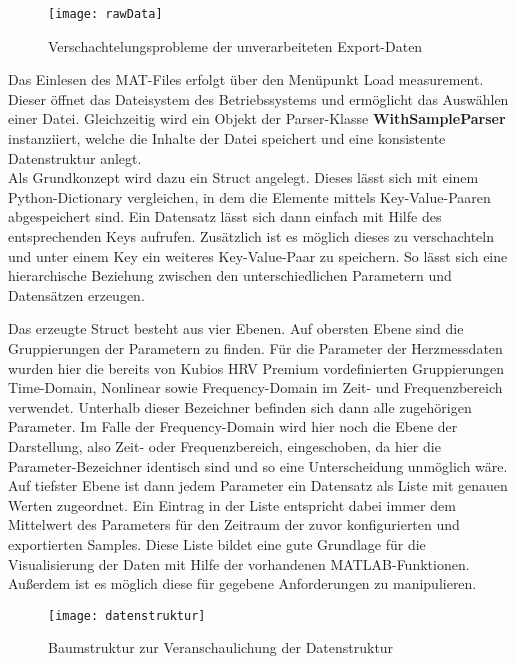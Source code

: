 \begin{figure}[H]
	\centering
	\texttt{[image: rawData]}
	\caption{Verschachtelungsprobleme der unverarbeiteten Export-Daten}
	\label{fig:rawData}
\end{figure}

Das Einlesen des MAT-Files erfolgt über den Menüpunkt \glqq Load measurement\grqq{}. Dieser öffnet das Dateisystem des Betriebssystems und ermöglicht das Auswählen einer Datei. Gleichzeitig wird ein Objekt der Parser-Klasse \textbf{WithSampleParser} instanziiert, welche die Inhalte der Datei speichert und eine konsistente Datenstruktur anlegt.\\
Als Grundkonzept wird dazu ein Struct angelegt. Dieses lässt sich mit einem Python-Dictionary vergleichen, in dem die Elemente mittels Key-Value-Paaren abgespeichert sind. Ein Datensatz lässt sich dann einfach mit Hilfe des entsprechenden Keys aufrufen. Zusätzlich ist es möglich dieses zu verschachteln und unter einem Key ein weiteres Key-Value-Paar zu speichern. So lässt sich eine hierarchische Beziehung zwischen den unterschiedlichen Parametern und Datensätzen erzeugen.

Das erzeugte Struct besteht aus vier Ebenen. Auf obersten Ebene sind die Gruppierungen der Parametern zu finden. Für die Parameter der Herzmessdaten wurden hier die bereits von Kubios HRV Premium vordefinierten Gruppierungen Time-Domain, Nonlinear sowie Frequency-Domain im Zeit- und Frequenzbereich verwendet. Unterhalb dieser Bezeichner befinden sich dann alle zugehörigen Parameter. Im Falle der Frequency-Domain wird hier noch die Ebene der Darstellung, also Zeit- oder Frequenzbereich, eingeschoben, da hier die Parameter-Bezeichner identisch sind und so eine Unterscheidung unmöglich wäre. Auf tiefster Ebene ist dann jedem Parameter ein Datensatz als Liste mit genauen Werten zugeordnet. Ein Eintrag in der Liste entspricht dabei immer dem Mittelwert des Parameters für den Zeitraum der zuvor konfigurierten und exportierten Samples. Diese Liste bildet eine gute Grundlage für die Visualisierung der Daten mit Hilfe der vorhandenen MATLAB-Funktionen. Außerdem ist es möglich diese für gegebene Anforderungen zu manipulieren.

\begin{figure}[H]
	\centering
	\texttt{[image: datenstruktur]}
	\caption{Baumstruktur zur Veranschaulichung der Datenstruktur}
	\label{fig:datenstruktur}
\end{figure}

